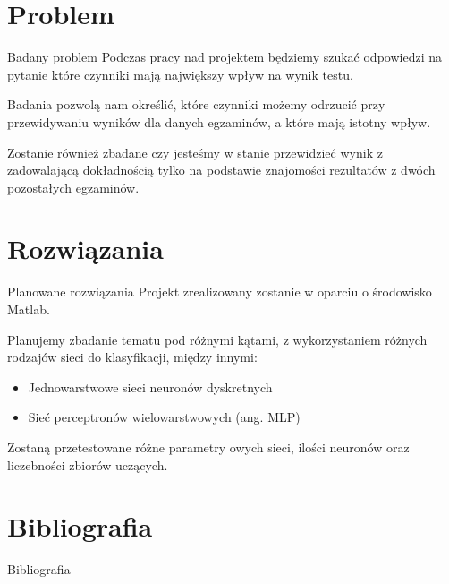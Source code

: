 \documentclass[10pt]{beamer}
\begin{document}
\section{Problem}
 
\begin{frame}{Badany problem}
Podczas pracy nad projektem będziemy szukać odpowiedzi na pytanie które czynniki mają największy wpływ na wynik testu.

Badania pozwolą nam określić, które czynniki możemy odrzucić przy przewidywaniu wyników dla danych egzaminów, a które mają istotny wpływ.

Zostanie również zbadane czy jesteśmy w stanie przewidzieć wynik z zadowalającą dokładnością tylko na podstawie znajomości rezultatów z dwóch pozostałych egzaminów.
 
\end{frame}

\section{Rozwiązania}
 
\begin{frame}{Planowane rozwiązania}
Projekt zrealizowany zostanie w oparciu o środowisko Matlab.

Planujemy zbadanie tematu pod różnymi  kątami, z wykorzystaniem różnych rodzajów sieci do klasyfikacji, między innymi:
\begin{itemize}
\item Jednowarstwowe sieci neuronów dyskretnych
\item Sieć perceptronów wielowarstwowych (ang. MLP)
\end{itemize}

Zostaną przetestowane różne parametry owych sieci, ilości neuronów oraz liczebności zbiorów uczących.

 
\end{frame}

\section{Bibliografia}
\begin{frame}[allowframebreaks]{Bibliografia}


\nocite{*}
\end{frame}
\end{document}
